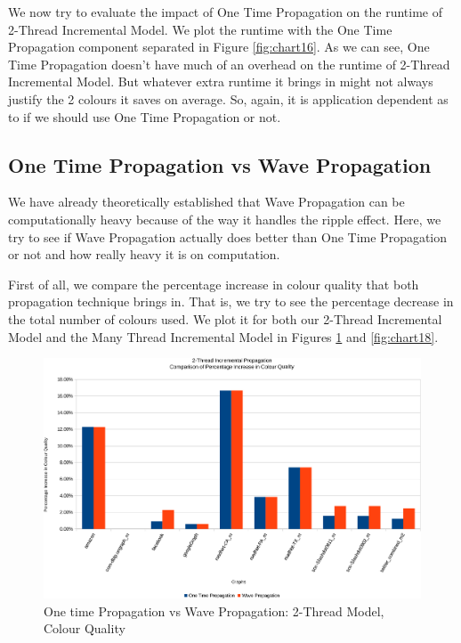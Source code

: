 \documentclass[MTech]{iitmdiss}
\begin{document}
We now try to evaluate the impact of One Time Propagation on the runtime of 2-Thread Incremental Model. We plot the runtime with the One Time Propagation component separated in Figure \ref{fig:chart16}. As we can see, One Time Propagation doesn't have much of an overhead on the runtime of 2-Thread Incremental Model. But whatever extra runtime it brings in might not always justify the 2 colours it saves on average. So, again, it is application dependent as to if we should use One Time Propagation or not.

\subsection{One Time Propagation vs Wave Propagation}
We have already theoretically established that Wave Propagation can be computationally heavy because of the way it handles the ripple effect. Here, we try to see if Wave Propagation actually does better than One Time Propagation or not and how really heavy it is on computation.

First of all, we compare the percentage increase in colour quality that both propagation technique brings in. That is, we try to see the percentage decrease in the total number of colours used. We plot it for both our 2-Thread Incremental Model and the Many Thread Incremental Model in Figures \ref{fig:chart17} and \ref{fig:chart18}.

\begin{figure}[h]
    \centering
    \includegraphics[width=\textwidth,keepaspectratio=true]{chartNewest32.pdf}
    \caption{
        One time Propagation vs Wave Propagation: 2-Thread Model, Colour Quality
    }
    \label{fig:chart17}
\end{figure}
\end{document}
